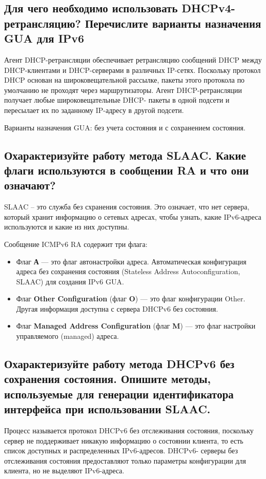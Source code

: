 \subsection{Для чего необходимо использовать DHCPv4-ретрансляцию? 
Перечислите варианты назначения GUA для IPv6}
Агент DHCP-ретрансляции обеспечивает ретрансляцию сообщений 
DHCP между DHCP-клиентами и DHCP-серверами в различных IP-сетях.
Поскольку протокол DHCP основан на широковещательной рассылке, 
пакеты этого протокола по умолчанию не проходят через маршрутизаторы. 
Агент DHCP-ретрансляции получает любые широковещательные DHCP-
пакеты в одной подсети и пересылает их по заданному IP-адресу в другой 
подсети.

Варианты назначения GUA: без учета состояния и с сохранением 
состояния.

\subsection{Охарактеризуйте работу метода SLAAC. Какие флаги 
используются в сообщении RA и что они означают?}
SLAAC – это служба без схранения состояния. Это означает, что нет 
сервера, который хранит информацию о сетевых адресах, чтобы узнать, 
какие IPv6-адреса используются и какие из них доступны.

Сообщение ICMPv6 RA содержит три флага:
\begin{itemize}
	\item Флаг \textbf{А} --- это флаг автонастройки адреса. Автоматическая 
		конфигурация адреса без сохранения состояния (Stateless Address 
		Autoconfiguration, SLAAC) для создания IPv6 GUA.
	\item Флаг \textbf{Other Configuration} (флаг \textbf{O})
		--- это флаг конфигурации 
		Other. Другая информация доступна с сервера DHCPv6 без 
		состояния.
	\item Флаг \textbf{Managed Address Configuration} (флаг \textbf{M})
		--- это флаг настройки управляемого (managed) адреса.
\end{itemize}

\subsection{Охарактеризуйте работу метода DHCPv6 без сохранения 
состояния. Опишите методы, используемые для генерации 
идентификатора интерфейса при использовании SLAAC.}
Процесс называется протокол DHCPv6 без отслеживания состояния, 
поскольку сервер не поддерживает никакую информацию о состоянии 
клиента, то есть список доступных и распределенных IPv6-адресов. DHCPv6-
серверы без отслеживания состояния предоставляют только параметры 
конфигурации для клиента, но не выделяют IPv6-адреса.

